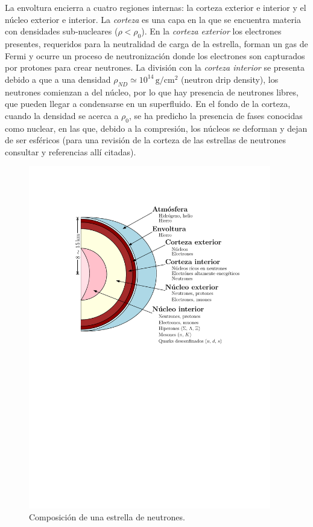 La envoltura encierra a cuatro regiones internas: la corteza exterior e interior y el núcleo exterior e interior. La \emph{corteza} es una capa en la que se encuentra materia con densidades sub-nucleares ($\rho < \rho_0$). En la \emph{corteza exterior} los electrones presentes, requeridos para la neutralidad de carga de la estrella, forman un gas de Fermi y ocurre un proceso de neutronización donde los electrones son capturados por protones para crear neutrones. La división con la \emph{corteza interior} se presenta debido a que a una densidad $\rho_{ND}\simeq 10^{14}\, \si{\gram\per\centi\metre^2}$ (neutron drip density), los neutrones comienzan a  del núcleo, por lo que hay presencia de neutrones libres, que pueden llegar a condensarse en un superfluido. En el fondo de la corteza, cuando la densidad se acerca a $\rho_0$, se ha predicho la presencia de fases conocidas como  nuclear, en las que, debido a la compresión, los núcleos se deforman y dejan de ser esféricos (para una revisión de la corteza de las estrellas de neutrones consultar \cite{Chamel2008} y referencias allí citadas). 

\begin{figure}[H]
    \centering
    \includegraphics[width=300pt]{figures/neutronstar.pdf}
    \caption{Composición de una estrella de neutrones.\protect\footnotemark}
    \label{NSC}
\end{figure}


